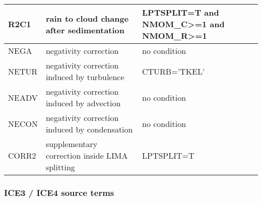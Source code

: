 \begin{longtable} {|p{}|p{}|p{}|}
R2C1   & rain to cloud change after sedimentation                 & LPTSPLIT=T and NMOM\_C>=1 and NMOM\_R>=1 \\\hline
NEGA   & negativity correction                                    & no condition \\\hline
NETUR  & negativity correction induced by turbulence              & CTURB='TKEL' \\\hline
NEADV  & negativity correction induced by advection               & no condition \\\hline
NECON  & negativity correction induced by condensation            & no condition \\\hline
CORR2  & supplementary correction inside LIMA splitting           & LPTSPLIT=T \\\hline
\end{longtable}

\subsubsection{ICE3 / ICE4 source terms}

